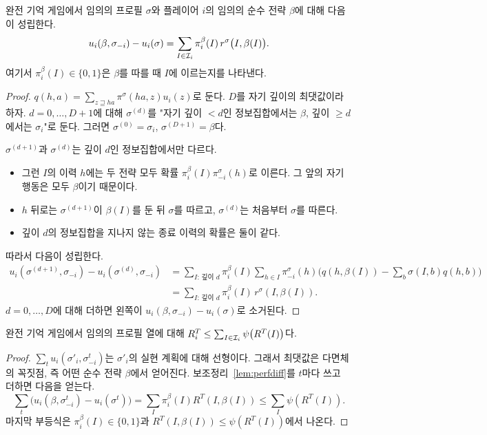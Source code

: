 \begin{lemma}[성능 차이 항등식]\label{lem:perfdiff}
완전 기억 게임에서 임의의 프로필 $\sigma$와 플레이어 $i$의 임의의 순수 전략 $\beta$에 대해 다음이 성립한다.
\[
u_i(\beta,\sigma_{-i})-u_i(\sigma)=\sum_{I\in\mathcal{I}_i}\pi_i^\beta(I)\,r^\sigma\big(I,\beta(I)\big).
\]
여기서 $\pi_i^\beta(I)\in\{0,1\}$은 $\beta$를 따를 때 $I$에 이르는지를 나타낸다.
\end{lemma}
\begin{proof}
$q(h,a)=\sum_{z\sqsupseteq ha}\pi^\sigma(ha,z)u_i(z)$로 둔다. $D$를 자기 깊이의 최댓값이라 하자.
$d=0,\dots,D+1$에 대해 $\sigma^{(d)}$를 "자기 깊이 $<d$인 정보집합에서는 $\beta$, 깊이 $\ge d$에서는 $\sigma_i$"로 둔다. 그러면 $\sigma^{(0)}=\sigma_i$, $\sigma^{(D+1)}=\beta$다.

$\sigma^{(d+1)}$과 $\sigma^{(d)}$는 깊이 $d$인 정보집합에서만 다르다.
\begin{itemize}
  \item 그런 $I$의 이력 $h$에는 두 전략 모두 확률 $\pi_i^\beta(I)\pi_{-i}^\sigma(h)$로 이른다. 그 앞의 자기 행동은 모두 $\beta$이기 때문이다.
  \item $h$ 뒤로는 $\sigma^{(d+1)}$이 $\beta(I)$를 둔 뒤 $\sigma$를 따르고, $\sigma^{(d)}$는 처음부터 $\sigma$를 따른다.
  \item 깊이 $d$의 정보집합을 지나지 않는 종료 이력의 확률은 둘이 같다.
\end{itemize}
따라서 다음이 성립한다.
\begin{align*}
u_i(\sigma^{(d+1)},\sigma_{-i})-u_i(\sigma^{(d)},\sigma_{-i})
&=\sum_{I:\,\text{깊이 }d}\pi_i^\beta(I)\sum_{h\in I}\pi^\sigma_{-i}(h)\Big(q(h,\beta(I))-\sum_b\sigma(I,b)q(h,b)\Big)\\
&=\sum_{I:\,\text{깊이 }d}\pi_i^\beta(I)\,r^\sigma(I,\beta(I)).
\end{align*}
$d=0,\dots,D$에 대해 더하면 왼쪽이 $u_i(\beta,\sigma_{-i})-u_i(\sigma)$로 소거된다.
\end{proof}

\begin{theorem}\label{thm:cfr-decomp}
완전 기억 게임에서 임의의 프로필 열에 대해 $R_i^T\le\sum_{I\in\mathcal{I}_i}\psi\big(R^T(I)\big)$다.
\end{theorem}
\begin{proof}
$\sum_tu_i(\sigma'_i,\sigma^t_{-i})$는 $\sigma'_i$의 실현 계획에 대해 선형이다. 그래서 최댓값은 다면체의 꼭짓점, 즉 어떤 순수 전략 $\beta$에서 얻어진다.
보조정리~\ref{lem:perfdiff}를 $t$마다 쓰고 더하면 다음을 얻는다.
\[
\sum_t\big(u_i(\beta,\sigma^t_{-i})-u_i(\sigma^t)\big)=\sum_I\pi_i^\beta(I)R^T(I,\beta(I))\le\sum_I\psi(R^T(I)).
\]
마지막 부등식은 $\pi_i^\beta(I)\in\{0,1\}$과 $R^T(I,\beta(I))\le\psi(R^T(I))$에서 나온다.
\end{proof}

